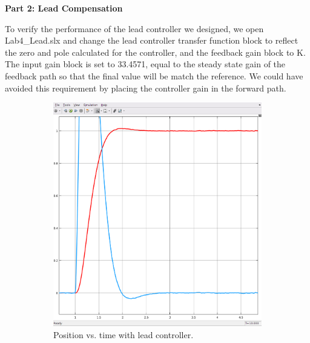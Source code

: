 \documentclass[11pt,a4paper]{article}
\begin{document}
\textbf{Part 2: Lead Compensation}

To verify the performance of the lead controller we designed, we open Lab4\_Lead.slx and change the lead controller transfer function block to reflect the zero and pole calculated for the controller, and the feedback gain block to K. The input gain block is set to 33.4571, equal to the steady state gain of the feedback path so that the final value will be match the reference.  We could have avoided this requirement by placing the controller gain in the forward path.

\begin{figure}[h!]
	\centering
	\begin{subfigure}{.5\textwidth}
		\centering
		\includegraphics[width = \textwidth]{imglab/lab4sol_leadtraj.png}
		\caption{Position vs. time with lead controller.}
	\end{subfigure}%
	\begin{subfigure}{.5\textwidth}
		\centering

\end{subfigure}
\end{figure}
\end{document}
